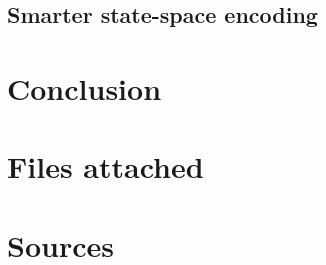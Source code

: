 \documentclass{article}
\begin{document}
\subsection*{Smarter state-space encoding}




\begin{comment}
Sample table in case it's needed
\begin{center}
	\begin{tabular}{ l | l | l | l | l | l || l | l | l | l || l}
		\textbf{K} & Sampling & C-space & VocabSize & TrainSize & Kernel & Airplanes & Cars & Faces & Motorbikes & MAP \\ 
		\hline
		400 & dense & gray & 100 & 300 & linear & 87 & 74 & 95 & 69 & 81 \\
		800 & dense & gray & 100 & 300 & linear & 93 & 70 & 86 & 73 & 81 \\
		1600 & dense & gray & 100 & 300 & linear & 88 & 72 & 86 & 64 & 78 \\
		2000 & dense & gray & 100 & 300 & linear & 86 & 73 & 81 & 51 & 73 \\	
		4000 & dense & gray & 100 & 300 & linear & 90 & 75 & 83 & 53 & 75 \\	
	\end{tabular}
\end{center}

\end{comment}


\section*{Conclusion}

\section*{Files attached}

\section*{Sources}


\begin{comment}
\begin{itemize}
	\item MatLab (http://www.mathworks.nl/products/matlab/)
	\item VL\_Feat (http://www.vlfeat.org/)
	\item LibSVM (http://www.csie.ntu.edu.tw/cjlin/libsvm/)
	\item Caltech Vision Group (http://www.vision.caltech.edu/)
\end{itemize}
\end{comment}
\end{document}
